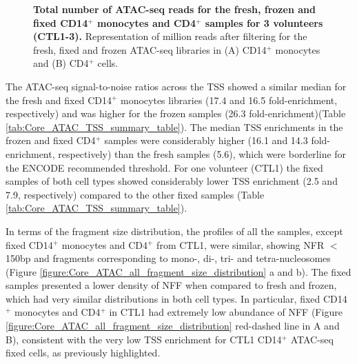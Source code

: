 \begin{figure}[htbp]
\begin{subfigure}{0.5\textwidth}
\caption{\textbf{}}
\end{subfigure}
\caption[Total number of ATAC-seq reads for the fresh, frozen and fixed CD14$^+$ monocytes and CD4$^+$ samples for 3 volunteers (CTL1-3).]{\textbf{Total number of ATAC-seq reads for the fresh, frozen and fixed CD14$^+$ monocytes and CD4$^+$ samples for 3 volunteers (CTL1-3).} Representation of million reads after filtering for the fresh, fixed and frozen ATAC-seq libraries in (A) CD14$^+$ monocytes and (B) CD4$^+$ cells.}
\label{figure:Core_ATAC_all_conditions_total_reads}
\end{figure} 

The ATAC-seq signal-to-noise ratios across the TSS showed a similar median for the fresh and fixed CD14$^+$ monocytes libraries (17.4 and 16.5 fold-enrichment, respectively) and was higher for the frozen samples (26.3 fold-enrichment)(Table \ref{tab:Core_ATAC_TSS_summary_table}). The median TSS enrichments in the frozen and fixed CD4$^+$ samples were considerably higher (16.1 and 14.3 fold-enrichment, respectively) than the fresh samples (5.6), which were borderline for the ENCODE recommended threshold. For one volunteer (CTL1) the fixed samples of both cell types showed considerably lower TSS enrichment (2.5 and 7.9, respectively) compared to the other fixed samples (Table \ref{tab:Core_ATAC_TSS_summary_table}). 


In terms of the fragment size distribution, the profiles of all the samples, except fixed CD14$^+$ monocytes and CD4$^+$ from CTL1, were similar, showing NFR $<$150bp and fragments corresponding to mono-, di-, tri- and tetra-nucleosomes (Figure \ref{figure:Core_ATAC_all_fragment_size_distribution} a and b). The fixed samples presented a lower density of NFF when compared to fresh and frozen, which had very similar distributions in both cell types. In particular, fixed CD14$^+$ monocytes and CD4$^+$ in CTL1 had extremely low abundance of NFF (Figure \ref{figure:Core_ATAC_all_fragment_size_distribution} red-dashed line in A and B), consistent with the very low TSS enrichment for CTL1 CD14$^+$ ATAC-seq fixed cells, as previously highlighted. 

